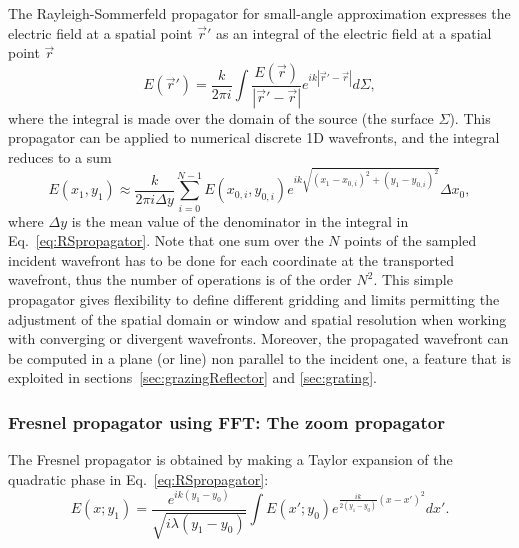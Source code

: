 \documentclass{iucr}
\begin{document}
The Rayleigh-Sommerfeld propagator for small-angle approximation expresses the electric field at a spatial point $\vec{r}'$ as an integral of the electric field at a spatial point $\vec{r}$ \cite{goodmanfourier}
\begin{equation}\label{eq:RSpropagator}
E(\vec{r}') =  \frac{k}{2 \pi i} \int \frac{E(\vec{r})}{|\vec{r}'-\vec{r}|} e^{ i k |\vec{r}' - \vec{r}|  }  d\Sigma,
\end{equation}
where the integral is made over the domain of the source (the surface $\Sigma$). 
This propagator can be applied to numerical discrete 1D wavefronts, and the integral reduces to a sum
\begin{equation}\label{eq:discreteRSpropagator}
E(x_1,y_1) \approx \frac{k}{2 \pi i \Delta y}  \sum_{i=0}^{N-1}  E(x_{0,i},y_{0,i}) e^{i k \sqrt{(x_1 - x_{0,i})^2 + (y_1 - y_{0,i})^2} }  \Delta x_0,
\end{equation}
where $\Delta y$ is the mean value of the denominator in the integral in Eq.~\ref{eq:RSpropagator}.
Note that one sum over the $N$ points of the sampled incident wavefront has to be done for each coordinate at the transported wavefront, thus the number of operations is of the order $N^2$. This simple propagator gives flexibility to define different gridding and limits permitting the adjustment of the spatial domain or window and spatial resolution when working with converging or divergent wavefronts. Moreover, the propagated wavefront can be computed in a plane (or line) non parallel to the incident one, a feature that is exploited in sections~\ref{sec:grazingReflector} and \ref{sec:grating}. 


\subsubsection{Fresnel propagator using FFT: The zoom propagator}
\label{sec:zoomPropagator}


The Fresnel propagator is obtained by making a Taylor expansion of the quadratic phase in Eq.~\ref{eq:RSpropagator}: 
\begin{equation}\label{eq:fresnelPropagator}
E(x;y_1) =  \frac{e^{i k (y_1-y_0)}}{\sqrt{i \lambda (y_1-y_0)}} \int E(x';y_0) e^{ \frac{i k}{2 (y_1-y_0)}  (x-x')^2  }  dx'.
\end{equation}
\end{document}
